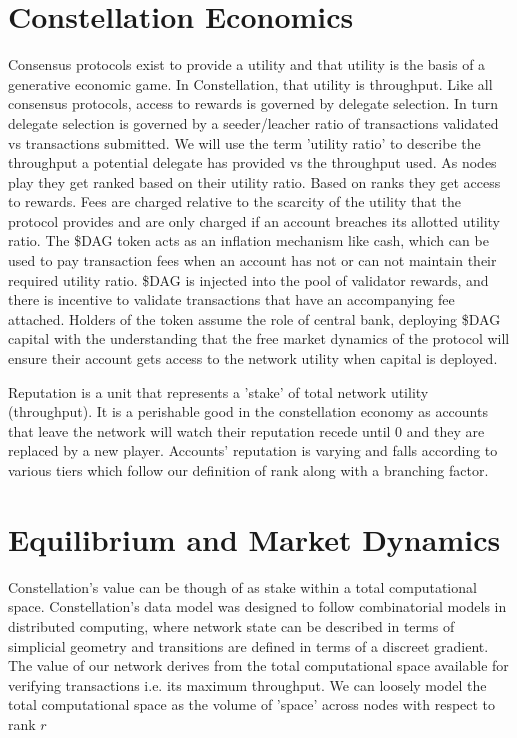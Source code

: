 \documentclass{article}
\begin{document}
\section{Constellation Economics}
Consensus protocols exist to provide a utility and that utility is the basis of a generative economic game. In Constellation, that utility is throughput. Like all consensus protocols, access to rewards is governed by delegate selection. In turn delegate selection is governed by a seeder/leacher ratio of transactions validated vs transactions submitted. We will use the term 'utility ratio' to describe the throughput a potential delegate has provided vs the throughput used. As nodes play they get ranked based on their utility ratio. Based on ranks they get access to rewards. Fees are charged relative to the scarcity of the utility that the protocol provides and are only charged if an account breaches its allotted utility ratio. The \$DAG token acts as an inflation mechanism like cash, which can be used to pay transaction fees when an account has not or can not maintain their required utility ratio. \$DAG is injected into the pool of validator rewards, and there is incentive to validate transactions that have an accompanying fee attached. Holders of the token assume the role of central bank, deploying \$DAG capital with the understanding that the free market dynamics of the protocol will ensure their account gets access to the network utility when capital is deployed. 

Reputation is a unit that represents a 'stake' of total network utility (throughput). It is a perishable good in the constellation economy as accounts that leave the network will watch their reputation recede until 0 and they are replaced by a new player. Accounts' reputation is varying and falls according to various tiers which follow our definition of rank along with a branching factor.

\section{Equilibrium and Market Dynamics}
Constellation's value can be though of as stake within a total computational space. Constellation's data model was designed to follow combinatorial models in distributed computing, where network state can be described in terms of simplicial geometry and transitions are defined in terms of a discreet gradient. The value of our network derives from the total computational space available for verifying transactions i.e. its maximum throughput. We can loosely model the total computational space as the volume of 'space' across nodes with respect to rank $r$
\end{document}
